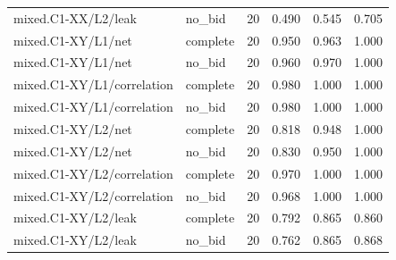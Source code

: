 \begin{longtable}{@{}p{2.2in}lrrrr@{}}
mixed.\allowbreak C1-XX/\allowbreak L2/\allowbreak leak & no\_\allowbreak bid & 20 & 0.490 & 0.545 & 0.705\\
mixed.\allowbreak C1-XY/\allowbreak L1/\allowbreak net & complete & 20 & 0.950 & 0.963 & 1.000\\
mixed.\allowbreak C1-XY/\allowbreak L1/\allowbreak net & no\_\allowbreak bid & 20 & 0.960 & 0.970 & 1.000\\
mixed.\allowbreak C1-XY/\allowbreak L1/\allowbreak correlation & complete & 20 & 0.980 & 1.000 & 1.000\\
mixed.\allowbreak C1-XY/\allowbreak L1/\allowbreak correlation & no\_\allowbreak bid & 20 & 0.980 & 1.000 & 1.000\\
mixed.\allowbreak C1-XY/\allowbreak L2/\allowbreak net & complete & 20 & 0.818 & 0.948 & 1.000\\
mixed.\allowbreak C1-XY/\allowbreak L2/\allowbreak net & no\_\allowbreak bid & 20 & 0.830 & 0.950 & 1.000\\
mixed.\allowbreak C1-XY/\allowbreak L2/\allowbreak correlation & complete & 20 & 0.970 & 1.000 & 1.000\\
mixed.\allowbreak C1-XY/\allowbreak L2/\allowbreak correlation & no\_\allowbreak bid & 20 & 0.968 & 1.000 & 1.000\\
mixed.\allowbreak C1-XY/\allowbreak L2/\allowbreak leak & complete & 20 & 0.792 & 0.865 & 0.860\\
mixed.\allowbreak C1-XY/\allowbreak L2/\allowbreak leak & no\_\allowbreak bid & 20 & 0.762 & 0.865 & 0.868\\
\end{longtable}\endgroup
